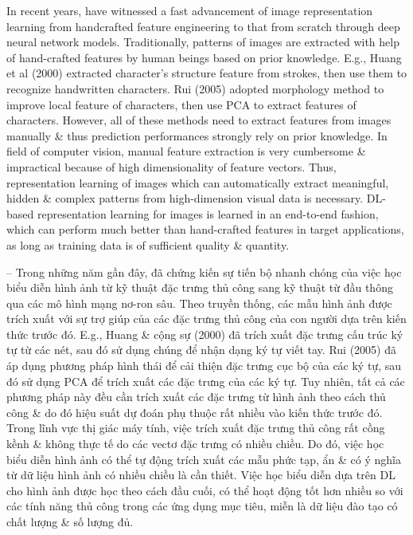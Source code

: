\documentclass{article}
\begin{document}
\begin{itemize}
\begin{itemize}
\begin{itemize}
            In recent years, have witnessed a fast advancement of image representation learning from handcrafted feature engineering to that from scratch through deep neural network models. Traditionally, patterns of images are extracted with help of hand-crafted features by human beings based on prior knowledge. E.g., Huang et al (2000) extracted character's structure feature from strokes, then use them to recognize handwritten characters. Rui (2005) adopted morphology method to improve local feature of characters, then use PCA to extract features of characters. However, all of these methods need to extract features from images manually \& thus prediction performances strongly rely on prior knowledge. In field of computer vision, manual feature extraction is very cumbersome \& impractical because of high dimensionality of feature vectors. Thus, representation learning of images which can automatically extract meaningful, hidden \& complex patterns from high-dimension visual data is necessary. DL-based representation learning for images is learned in an end-to-end fashion, which can perform much better than hand-crafted features in target applications, as long as training data is of sufficient quality \& quantity.

            -- Trong những năm gần đây, đã chứng kiến sự tiến bộ nhanh chóng của việc học biểu diễn hình ảnh từ kỹ thuật đặc trưng thủ công sang kỹ thuật từ đầu thông qua các mô hình mạng nơ-ron sâu. Theo truyền thống, các mẫu hình ảnh được trích xuất với sự trợ giúp của các đặc trưng thủ công của con người dựa trên kiến thức trước đó. E.g., Huang \& cộng sự (2000) đã trích xuất đặc trưng cấu trúc ký tự từ các nét, sau đó sử dụng chúng để nhận dạng ký tự viết tay. Rui (2005) đã áp dụng phương pháp hình thái để cải thiện đặc trưng cục bộ của các ký tự, sau đó sử dụng PCA để trích xuất các đặc trưng của các ký tự. Tuy nhiên, tất cả các phương pháp này đều cần trích xuất các đặc trưng từ hình ảnh theo cách thủ công \& do đó hiệu suất dự đoán phụ thuộc rất nhiều vào kiến thức trước đó. Trong lĩnh vực thị giác máy tính, việc trích xuất đặc trưng thủ công rất cồng kềnh \& không thực tế do các vectơ đặc trưng có nhiều chiều. Do đó, việc học biểu diễn hình ảnh có thể tự động trích xuất các mẫu phức tạp, ẩn \& có ý nghĩa từ dữ liệu hình ảnh có nhiều chiều là cần thiết. Việc học biểu diễn dựa trên DL cho hình ảnh được học theo cách đầu cuối, có thể hoạt động tốt hơn nhiều so với các tính năng thủ công trong các ứng dụng mục tiêu, miễn là dữ liệu đào tạo có chất lượng \& số lượng đủ.


\end{itemize}
\end{itemize}
\end{itemize}
\end{document}
